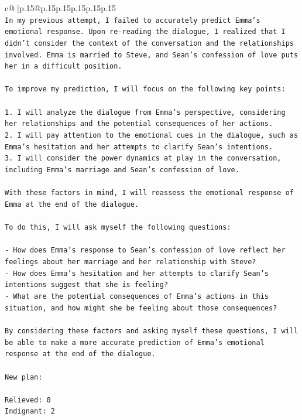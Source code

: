 \documentclass{article}
\begin{document}
{\begin{supertabular}{c@{$\;$}|p{.15\linewidth}@{}p{.15\linewidth}p{.15\linewidth}p{.15\linewidth}p{.15\linewidth}p{.15\linewidth}}
{{{\\ 
\texttt{In my previous attempt, I failed to accurately predict Emma's emotional response. Upon re{-}reading the dialogue, I realized that I didn't consider the context of the conversation and the relationships involved. Emma is married to Steve, and Sean's confession of love puts her in a difficult position. } \\
\\ 
\texttt{To improve my prediction, I will focus on the following key points:} \\
\\ 
\texttt{1.  I will analyze the dialogue from Emma's perspective, considering her relationships and the potential consequences of her actions.} \\
\texttt{2.  I will pay attention to the emotional cues in the dialogue, such as Emma's hesitation and her attempts to clarify Sean's intentions.} \\
\texttt{3.  I will consider the power dynamics at play in the conversation, including Emma's marriage and Sean's confession of love.} \\
\\ 
\texttt{With these factors in mind, I will reassess the emotional response of Emma at the end of the dialogue.} \\
\\ 
\texttt{To do this, I will ask myself the following questions:} \\
\\ 
\texttt{{-} How does Emma's response to Sean's confession of love reflect her feelings about her marriage and her relationship with Steve?} \\
\texttt{{-} How does Emma's hesitation and her attempts to clarify Sean's intentions suggest that she is feeling?} \\
\texttt{{-} What are the potential consequences of Emma's actions in this situation, and how might she be feeling about those consequences?} \\
\\ 
\texttt{By considering these factors and asking myself these questions, I will be able to make a more accurate prediction of Emma's emotional response at the end of the dialogue.} \\
\\ 
\texttt{New plan: } \\
\\ 
\texttt{Relieved: 0} \\
\texttt{Indignant: 2} \\
}}}
\end{supertabular}}
\end{document}
